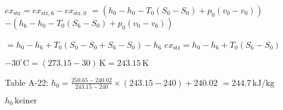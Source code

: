 \( ex_{\text{str}} = ex_{\text{str},6} - ex_{\text{str},0} \)  
\( = (h_0 - h_0 - T_0(S_0 - S_0) + p_0(v_0 - v_0)) \)  
\( - (h_6 - h_0 - T_0(S_6 - S_0) + p_0(v_0 - v_6)) \)  

\( = h_0 - h_6 + T_0(S_0 - S_0 + S_6 - S_0) - h_6 \)  
\( ex_{\text{str}} = h_0 - h_6 + T_0(S_6 - S_0) \)  

\( -30^\circ \text{C} = (273.15 - 30) \, \text{K} = 243.15 \, \text{K} \)  

Table A-22:  
\( h_0 = \frac{250.65 - 240.02}{243.15 - 240} \times (243.15 - 240) + 240.02 \)  
\( = 244.7 \, \text{kJ/kg} \)  

\( h_0 \, \text{keiner} \)